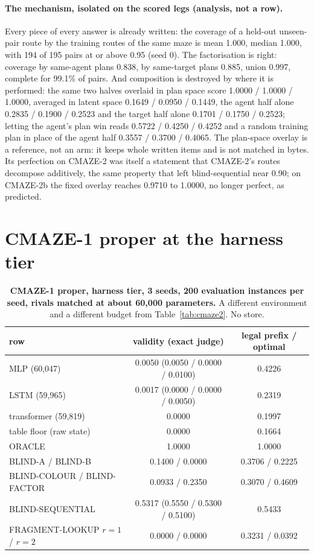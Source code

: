 \documentclass{article} %
\begin{document}
\paragraph{The mechanism, isolated on the scored legs (analysis, not a row).} Every piece of every
answer is already written: the coverage of a held-out unseen-pair route by the training routes of
the same maze is mean 1.000, median 1.000, with 194 of 195 pairs at or above 0.95 (seed 0). The
factorisation is right: coverage by same-agent plans 0.838, by same-target plans 0.885, union
0.997, complete for 99.1\% of pairs. And composition is destroyed by where it is performed: the
same two halves overlaid in plan space score 1.0000 / 1.0000 / 1.0000, averaged in latent space
0.1649 / 0.0950 / 0.1449, the agent half alone 0.2835 / 0.1900 / 0.2523 and the target half alone
0.1701 / 0.1750 / 0.2523; letting the agent's plan win reads 0.5722 / 0.4250 / 0.4252 and a random
training plan in place of the agent half 0.3557 / 0.3700 / 0.4065. %
The plan-space overlay is a reference, not an arm: it keeps whole written items and is not matched
in bytes. Its perfection on CMAZE-2 was itself a statement that CMAZE-2's routes decompose
additively, the same property that left blind-sequential near 0.90; on CMAZE-2b the fixed overlay
reaches 0.9710 to 1.0000, no longer perfect, as predicted. %

\section{CMAZE-1 proper at the harness tier}
\label{app:cmaze1}

\begin{table}[h]
\centering\small
\caption{\textbf{CMAZE-1 proper, harness tier, 3 seeds, 200 evaluation instances per seed, rivals
matched at about 60,000 parameters.} A different environment and a different budget from
Table~\ref{tab:cmaze2}. No store.}
\label{tab:cmaze1}
\begin{tabular}{lcc}
\toprule
row & validity (exact judge) & legal prefix / optimal \\
\midrule
MLP (60,047) & 0.0050 (0.0050 / 0.0000 / 0.0100) & 0.4226 \\
LSTM (59,965) & 0.0017 (0.0000 / 0.0000 / 0.0050) & 0.2319 \\
transformer (59,819) & 0.0000 & 0.1997 \\
table floor (raw state) & 0.0000 & 0.1664 \\
ORACLE & 1.0000 & 1.0000 \\
BLIND-A / BLIND-B & 0.1400 / 0.0000 & 0.3706 / 0.2225 \\
BLIND-COLOUR / BLIND-FACTOR & 0.0933 / 0.2350 & 0.3070 / 0.4609 \\
BLIND-SEQUENTIAL & 0.5317 (0.5550 / 0.5300 / 0.5100) & 0.5433 \\
FRAGMENT-LOOKUP $r=1$ / $r=2$ & 0.0000 / 0.0000 & 0.3231 / 0.0392 \\
\bottomrule
\end{tabular}
\end{table}
\end{document}
